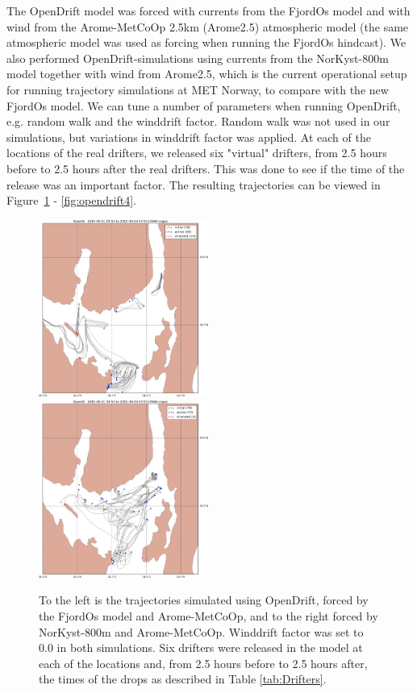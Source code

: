 \documentclass[12pt,a4paper,english]{article}
\begin{document}
The OpenDrift model was forced with currents from the FjordOs model and with wind from the Arome-MetCoOp 2.5km (Arome2.5) atmospheric model (the same atmospheric model was used as forcing when running the FjordOs hindcast). We also performed OpenDrift-simulations using currents from the NorKyst-800m model together with wind from Arome2.5, which is the current operational setup for running trajectory simulations at MET Norway, to compare with the new FjordOs model. We can tune a number of parameters when running OpenDrift, e.g. random walk and the winddrift factor. Random walk was not used in our simulations, but variations in winddrift factor was applied. At each of the locations of the real drifters, we released six "virtual" drifters, from 2.5 hours before to 2.5 hours after the real drifters. This was done to see if the time of the release was an important factor. The resulting trajectories can be viewed in Figure~\ref{fig:opendrift1} - \ref{fig:opendrift4}.


\begin{figure}[ht]
\centerline{
\includegraphics*[width=0.495\textwidth]{Opendrift_simulations/LTR3/tokt_drifters_winddrift_0p0_radius_0_num_6_plusminus_2p5h_crop}
\includegraphics*[width=0.495\textwidth]{Opendrift_simulations/LTR3/tokt_drifters_winddrift_0p0_radius_0_num_6_plusminus_2p5h_norkyst_crop}
}
\caption{\small
To the left is the trajectories simulated using OpenDrift, forced by the FjordOs model and Arome-MetCoOp, and to the right forced by NorKyst-800m and Arome-MetCoOp. Winddrift factor was set to 0.0 in both simulations. Six drifters were released in the model at each of the locations and, from 2.5 hours before to 2.5 hours after, the times of the drops as described in Table \ref{tab:Drifters}.
}
\label{fig:opendrift1}
\end{figure}
\end{document}
